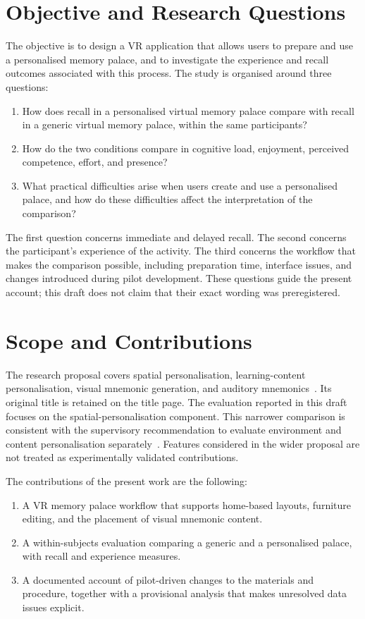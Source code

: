 \section{Objective and Research Questions}
The objective is to design a VR application that allows users to prepare and use a personalised memory palace, and to investigate the experience and recall outcomes associated with this process. The study is organised around three questions:
\begin{enumerate}
    \item How does recall in a personalised virtual memory palace compare with recall in a generic virtual memory palace, within the same participants?
    \item How do the two conditions compare in cognitive load, enjoyment, perceived competence, effort, and presence?
    \item What practical difficulties arise when users create and use a personalised palace, and how do these difficulties affect the interpretation of the comparison?
\end{enumerate}
The first question concerns immediate and delayed recall. The second concerns the participant's experience of the activity. The third concerns the workflow that makes the comparison possible, including preparation time, interface issues, and changes introduced during pilot development. These questions guide the present account; this draft does not claim that their exact wording was preregistered.

\section{Scope and Contributions}
The research proposal covers spatial personalisation, learning-content personalisation, visual mnemonic generation, and auditory mnemonics~\cite{sroorproposal}. Its original title is retained on the title page. The evaluation reported in this draft focuses on the spatial-personalisation component. This narrower comparison is consistent with the supervisory recommendation to evaluate environment and content personalisation separately~\cite{meetingjan2026}. Features considered in the wider proposal are not treated as experimentally validated contributions.

The contributions of the present work are the following:
\begin{enumerate}
    \item A VR memory palace workflow that supports home-based layouts, furniture editing, and the placement of visual mnemonic content.
    \item A within-subjects evaluation comparing a generic and a personalised palace, with recall and experience measures.
    \item A documented account of pilot-driven changes to the materials and procedure, together with a provisional analysis that makes unresolved data issues explicit.
\end{enumerate}

